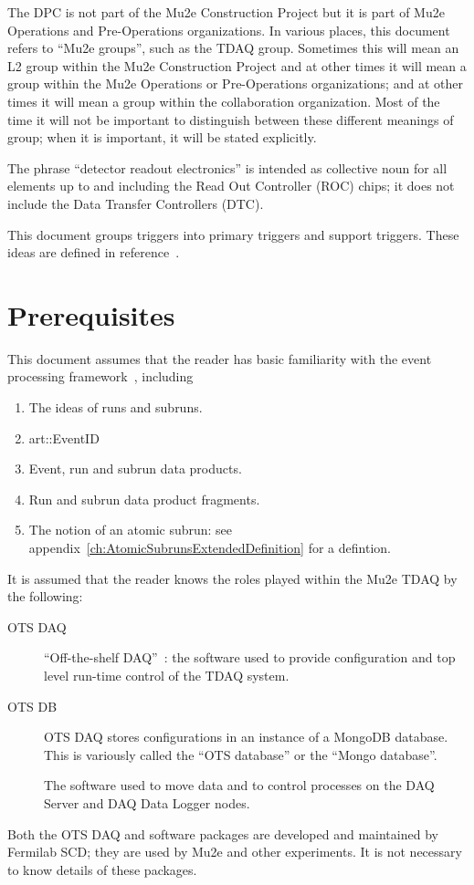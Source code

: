 The DPC is not part of the Mu2e Construction Project but it is part of Mu2e Operations
and Pre-Operations organizations.
In various places, this document refers to ``Mu2e groups'', such as the TDAQ group.
Sometimes this will mean an L2 group within the Mu2e Construction Project and at other
times it will mean a group within the Mu2e Operations or Pre-Operations organizations;
and at other times it will mean a group within the collaboration organization.
Most of the time it will not be important to distinguish between these different meanings
of group; when it is important, it will be stated explicitly.

The phrase ``detector readout electronics'' is intended as collective noun for all elements
up to and including the Read Out Controller (ROC) chips; it does not include
the Data Transfer Controllers (DTC).

This document groups triggers into primary triggers and support triggers.
These ideas are defined in reference~\cite{TriggerSU2020}.



\section{Prerequisites}

This document assumes that the reader has basic familiarity with the \art event processing framework~\cite{ARTWORDPRESS}, including

\begin{enumerate}
\item The ideas of runs and subruns.
\item {\code art::EventID}
\item Event, run and subrun  data products.
\item Run and subrun data product fragments.
\item The notion of an atomic subrun: see appendix~\ref{ch:AtomicSubrunsExtendedDefinition} for a defintion.
\end{enumerate}

It is assumed that the reader knows the roles played within the Mu2e TDAQ by the following:
\begin{description}
\item[OTS DAQ] ``Off-the-shelf DAQ''~\cite{MU2EOTSDAQ}: the software used to provide configuration and top level run-time control of the TDAQ system.
\item[OTS DB] OTS DAQ stores configurations in an instance of a MongoDB database.  This is variously called the ``OTS database'' or the ``Mongo database''.
\item[\artdaq] The software used to move data and to control processes on the DAQ Server and DAQ Data Logger nodes.
\end{description}
Both the OTS DAQ and \artdaq software packages are developed and maintained by Fermilab SCD;
they are used by Mu2e and other experiments. It is not necessary to know details of these packages.


